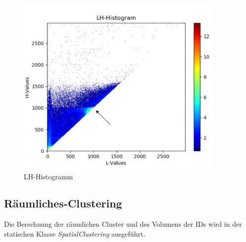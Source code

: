 \begin{figure}[H] 
\includegraphics[width=0.9\textwidth]{Logos/LHHistogram_a.png}
\caption{LH-Histogramm} 
\label{fig:lh_histo} 
\end{figure}



\subsection{Räumliches-Clustering}

Die Berechnung der räumlichen Cluster und des Volumens der IDs wird in der statischen Klasse \textit{SpatialClustering} ausgeführt.


